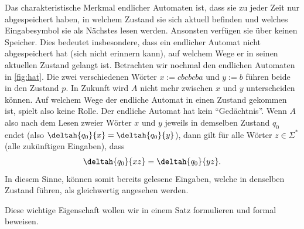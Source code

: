 Das charakteristische Merkmal endlicher Automaten ist, dass sie zu jeder Zeit nur abgespeichert haben, in welchem Zustand sie sich aktuell befinden und welches Eingabesymbol sie als Nächstes lesen werden. Ansonsten verfügen sie über keinen Speicher. Dies bedeutet insbesondere, dass ein endlicher Automat nicht abgespeichert hat (sich nicht erinnern kann), auf welchem Wege er in seinen aktuellen Zustand gelangt ist. Betrachten wir nochmal den endlichen Automaten in \cref{fig:hat}. Die zwei verschiedenen Wörter $x:= cbcbcba$ und $y := b$ führen beide in den Zustand $p$. In Zukunft wird $A$ nicht mehr zwischen $x$ und $y$ unterscheiden können. Auf welchem Wege der endliche Automat in einen Zustand gekommen ist, spielt also keine Rolle. Der endliche Automat hat kein \enquote{Gedächtnis}. Wenn $A$ also nach dem Lesen zweier Wörter $x$ und $y$ jeweils in demselben Zustand $q_0$ endet (also $\deltah{q_0}{x} = \deltah{q_0}{y}$), dann gilt für alle Wörter $z\in\Sigma^*$ (alle zukünftigen Eingaben), dass
\begin{align*}
	\deltah{q_0}{xz} = \deltah{q_0}{yz}.
\end{align*}
In diesem Sinne, können somit bereits gelesene Eingaben, welche in denselben Zustand führen, als gleichwertig angesehen werden.

Diese wichtige Eigenschaft wollen wir in einem Satz formulieren und formal beweisen.

